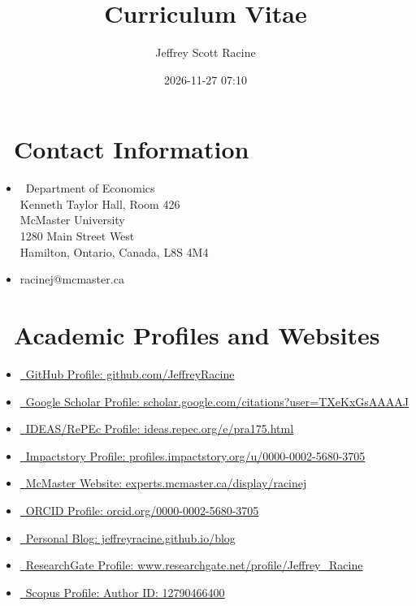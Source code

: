 \documentclass[
]{article}
\title{Curriculum Vitae}
\author{Jeffrey Scott Racine}
\date{2026-11-27 07:10}
\begin{document}
\maketitle


\section*{\texorpdfstring{\faHome~Contact
Information}{~Contact Information}}\label{contact-information}

\begin{itemize}
\item
  \faPaperPlane~Department of Economics\\
  Kenneth Taylor Hall, Room 426\\
  McMaster University\\
  1280 Main Street West\\
  Hamilton, Ontario, Canada, L8S 4M4
\item
  \href{mailto:racinej@mcmaster.ca}{\faEnvelope} racinej@mcmaster.ca
\end{itemize}

\section*{\texorpdfstring{\faGlobeAmericas~Academic Profiles and
Websites}{~Academic Profiles and Websites}}\label{academic-profiles-and-websites}

\begin{itemize}
\item
  \href{https://github.com/JeffreyRacine}{\faGithub~GitHub Profile:
  github.com/JeffreyRacine}
\item
  \href{https://scholar.google.com/citations?user=TXeKxGsAAAAJ}{\aiGoogleScholar~Google
  Scholar Profile: scholar.google.com/citations?user=TXeKxGsAAAAJ}
\item
  \href{https://ideas.repec.org/e/pra175.html}{\aiIDEASRePEc~IDEAS/RePEc
  Profile: ideas.repec.org/e/pra175.html}
\item
  \href{https://profiles.impactstory.org/u/0000-0002-5680-3705}{\aiImpactstory~Impactstory
  Profile: profiles.impactstory.org/u/0000-0002-5680-3705}
\item
  \href{https://experts.mcmaster.ca/display/racinej}{\faUniversity~McMaster
  Website: experts.mcmaster.ca/display/racinej}
\item
  \href{https://orcid.org/0000-0002-5680-3705}{\aiOrcid~ORCID Profile:
  orcid.org/0000-0002-5680-3705}
\item
  \href{https://jeffreyracine.github.io/blog}{\faBlog~Personal Blog:
  jeffreyracine.github.io/blog}
\item
  \href{https://www.researchgate.net/profile/Jeffrey_Racine}{\aiResearchGate~ResearchGate
  Profile: www.researchgate.net/profile/Jeffrey\_Racine}
\item
  \href{https://www.scopus.com/authid/detail.uri?authorId=12790466400}{\faGlobeAmericas~Scopus
  Profile: Author ID: 12790466400}
\end{itemize}
\end{document}
